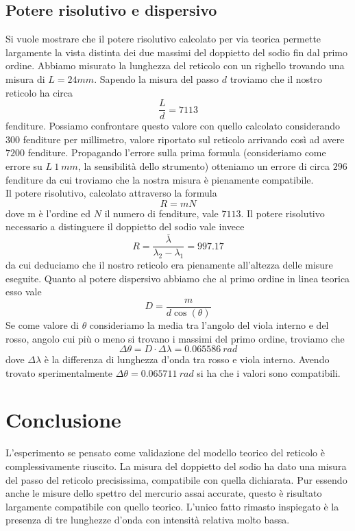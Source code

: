 \documentclass[a4paper,10pt]{article}
\begin{document}
	\subsection{Potere risolutivo e dispersivo}
	Si vuole mostrare che il potere risolutivo calcolato per via teorica permette largamente la vista distinta dei due massimi del doppietto del sodio fin dal primo ordine. Abbiamo misurato la lunghezza del reticolo con un righello trovando una misura di $L = 24 mm$. Sapendo la misura del passo $d$ troviamo che il nostro reticolo ha circa $$\frac{L}{d} = 7113$$ 
	fenditure. Possiamo confrontare questo valore con quello calcolato considerando 300 fenditure per millimetro, valore riportato sul reticolo arrivando così ad avere $7200$ fenditure. Propagando l'errore sulla prima formula (consideriamo come errore su $L \ 1 \ mm$, la sensibilità dello strumento) otteniamo un errore di circa $296$ fenditure da cui troviamo che la nostra misura è pienamente compatibile. \\
	Il potere risolutivo, calcolato attraverso la formula 
	$$R = mN$$
	dove m è l'ordine ed $ N $ il numero di fenditure, vale $7113$. Il potere risolutivo necessario a distinguere il doppietto del sodio vale invece 
	$$R = \frac{\overline{\lambda}}{\lambda _2 - \lambda _1} = 997.17$$ 
	da cui deduciamo che il nostro reticolo era pienamente all'altezza delle misure eseguite. Quanto al potere dispersivo abbiamo che al primo ordine in linea teorica esso vale $$D = \frac{m}{d \cos(\theta)}$$ 
	Se come valore di $\theta$ consideriamo la media tra l'angolo del viola interno e del rosso, angolo cui più o meno si trovano i massimi del primo ordine, troviamo che 
	$$\Delta \theta = D \cdot \Delta \lambda = 0.065586 \ rad$$
	dove $\Delta \lambda$ è la differenza di lunghezza d'onda tra rosso e viola interno. Avendo trovato sperimentalmente $\Delta \theta = 0.065711 \ rad$ si ha che i valori sono compatibili.
	
	\section{Conclusione}
	L'esperimento se pensato come validazione del modello teorico del reticolo è complessivamente riuscito. La misura del doppietto del sodio ha dato una misura del passo del reticolo precisissima, compatibile con quella dichiarata. Pur essendo anche le misure dello spettro del mercurio assai accurate, questo è risultato largamente compatibile con quello teorico. L'unico fatto rimasto inspiegato è la presenza di tre lunghezze d'onda con intensità relativa molto bassa.
\end{document}
